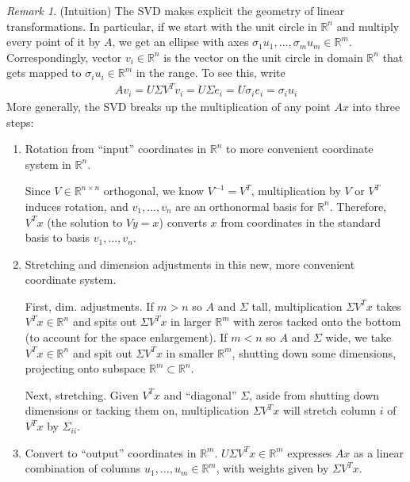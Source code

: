 \documentclass[12pt]{article}
\numberwithin{equation}{section} %
\theoremstyle{plain}
\theoremstyle{definition}
\theoremstyle{remark}
\newtheorem*{rmk}{Remark}
\newcommand{\Rn}{\mathbb{R}^n}
\newcommand{\Rm}{\mathbb{R}^m}
\newcommand{\Rnn}{\mathbb{R}^{n\times n}}
\begin{document}
\begin{rmk}(Intuition)
The SVD makes explicit the geometry of linear transformations. In
particular, if we start with the unit circle in $\Rn$ and multiply every
point of it by $A$, we get an ellipse with axes
$\sigma_1u_1,\ldots,\sigma_mu_m\in\Rm$. Correspondingly, vector
$v_i\in\Rn$ is the vector on the unit circle in domain $\Rn$ that gets
mapped to $\sigma_iu_i\in\Rm$ in the range. To see this, write
\begin{align*}
  Av_i = U\Sigma V^T v_i = U\Sigma e_i
  = U\sigma_i e_i = \sigma_iu_i
\end{align*}
More generally, the SVD breaks up the multiplication of any point $Ax$
into three steps:
\begin{enumerate}
  \item
    Rotation from ``input'' coordinates in $\Rn$ to more
    convenient coordinate system in $\Rn$.

    Since $V\in\Rnn$ orthogonal, we know $V^{-1}=V^T$, multiplication by
    $V$ or $V^T$ induces rotation, and $v_1,\ldots,v_n$ are an
    orthonormal basis for $\Rn$. Therefore, $V^Tx$ (the solution to
    $Vy=x$) converts $x$ from coordinates in the standard basis to basis
    $v_1,\ldots,v_n$.

  \item Stretching and dimension adjustments in this new, more
    convenient coordinate system.

    First, dim. adjustments. If $m>n$ so $A$ and $\Sigma$ tall,
    multiplication $\Sigma V^Tx$ takes $V^Tx\in\Rn$ and spits out
    $\Sigma V^Tx$ in larger $\Rm$ with zeros tacked onto the bottom (to
    account for the space enlargement). If $m<n$ so $A$ and $\Sigma$
    wide, we take $V^Tx\in\Rn$ and spit out $\Sigma V^Tx$ in smaller
    $\Rm$, shutting down some dimensions, projecting onto subspace
    $\Rm\subset\Rn$.

    Next, stretching. Given $V^Tx$ and ``diagonal'' $\Sigma$, aside from
    shutting down dimensions or tacking them on, multiplication $\Sigma
    V^Tx$ will stretch column $i$ of $V^Tx$ by $\Sigma_{ii}$.

  \item Convert to ``output'' coordinates in $\Rm$.
    $U\Sigma V^Tx\in\Rm $ expresses $Ax$ as a linear combination of
    columns $u_1,\ldots,u_m\in\Rm$, with weights given by $\Sigma V^Tx$.
\end{enumerate}
\end{rmk}
\end{document}
